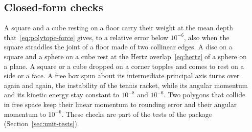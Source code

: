 \subsection{Closed-form checks}

A square and a cube resting on a floor carry their weight at the mean depth that~\eqref{eq:polytope-force} gives, to a relative error below $10^{-6}$, also when the square straddles the joint of a floor made of two collinear edges.
A disc on a square and a sphere on a cube rest at the Hertz overlap~\eqref{eq:hertz} of a sphere on a plane.
A square or a cube dropped on a corner topples and comes to rest on a side or a face.
A free box spun about its intermediate principal axis turns over again and again, the instability of the tennis racket, while its angular momentum and its kinetic energy stay constant to $10^{-8}$ and $10^{-6}$.
Two polygons that collide in free space keep their linear momentum to rounding error and their angular momentum to $10^{-6}$.
These checks are part of the tests of the package (Section~\ref{sec:unit-tests}).
